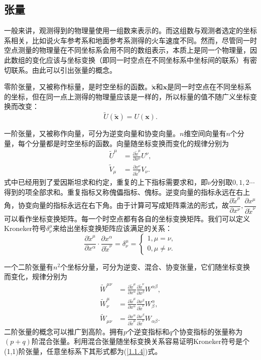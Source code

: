 \documentclass[11pt, a4paper, oneside, onecolumn]{ctexart}
\numberwithin{equation}{subsection}
\begin{document}
\subsection{张量}
一般来讲，观测得到的物理量使用一组数来表示的。而这组数与观测者选定的坐标系相关，比如说火车参考系和地面参考系测得的火车速度不同。然而，尽管同一时空点测量的物理量在不同坐标系会用不同的数组表示，本质上是同一个物理量，因此数组的变化应该与坐标变换（即同一时空点在不同坐标系中坐标间的联系）有密切联系。由此可以引出张量的概念。

零阶张量，又被称作标量，是时空坐标的函数。$\widetilde{\boldsymbol{x}}$和$\boldsymbol{x}$是同一时空点在不同坐标系的坐标，但在同一点上测得的物理量应该是一样的，所以标量的值不随广义坐标变换而改变：
\begin{equation}
\widetilde{U}\left(\widetilde{\boldsymbol{x}}\right)=U\left(\boldsymbol{x}\right).
\end{equation}

一阶张量，又被称作向量，可分为逆变向量和协变向量。$n$维空间向量有$n$个分量，每个分量都是时空坐标的函数。向量随坐标变换而变化的规律分别为
\begin{align}
\widetilde{U}^{\mu}&=\frac{\partial{}\widetilde{x}^{\mu}}{\partial{}x^{\nu}}U^{\nu},\\
\widetilde{V}_{\mu}&=\frac{\partial{}{x}^{\nu}}{\partial{}\widetilde{x}^{\mu}}V_{\nu}.
\end{align}
式中已经用到了爱因斯坦求和约定，重复的上下指标需要求和，即$\nu$分别取$0,1,2\cdots$得到的项全部求和。重复指标又称傀儡指标、傀标。逆变向量的指标永远在右上角，协变向量的指标永远在右下角。由于计算可写成矩阵乘法的形式，故$\dfrac{\partial{}\widetilde{x}^{\mu}}{\partial{}x^{\nu}},\dfrac{\partial{}x^{\mu}}{\partial{}\widetilde{x}^{\nu}}$可以看作坐标变换矩阵。每一个时空点都有各自的坐标变换矩阵。我们可以定义Kroneker符号$\delta{}^{\mu}_{\nu}$来给出坐标变换矩阵应该满足的关系：
\begin{equation}
\frac{\partial{}\widetilde{x}^{\mu}}{\partial{}x^{\alpha}}\cdot\frac{\partial{}x^{\alpha}}{\partial{}\widetilde{x}^{\nu}}=\delta{}_{\nu}^{\mu}=
\begin{cases}
1,\mu=\nu,\\
0,\mu\ne\nu.
\end{cases}\label{1.1.4}
\end{equation}

一个二阶张量有$n^{2}$个坐标分量，可分为逆变、混合、协变张量，它们随坐标变换而变化，规律分别为
\begin{align}
\widetilde{W}^{\mu\nu}&=\frac{\partial{}\widetilde{x}^{\mu}}{\partial{}x^{\alpha}}\frac{\partial{}\widetilde{x}^{\nu}}{\partial{}x^{\beta}}W^{\alpha\beta},\\
\widetilde{W}^{\mu}_{\nu}&=\frac{\partial{}\widetilde{x}^{\mu}}{\partial{}x^{\alpha}}\frac{\partial{}{x}^{\beta}}{\partial{}\widetilde{x}^{\nu}}W^{\alpha}_{\beta},\\
\widetilde{W}_{\mu\nu}&=\frac{\partial{}{x}^{\alpha}}{\partial{}\widetilde{x}^{\mu}}\frac{\partial{}{x}^{\beta}}{\partial{}\widetilde{x}^{\nu}}W_{\alpha\beta}.
\end{align}
二阶张量的概念可以推广到高阶。拥有$p$个逆变指标和$q$个协变指标的张量称为$\left(p+q\right)$阶混合张量。利用混合张量随坐标变换关系容易证明Kroneker符号是个(1,1)阶张量，任意坐标系下其形式都为(\ref{1.1.4})式。
\end{document}

